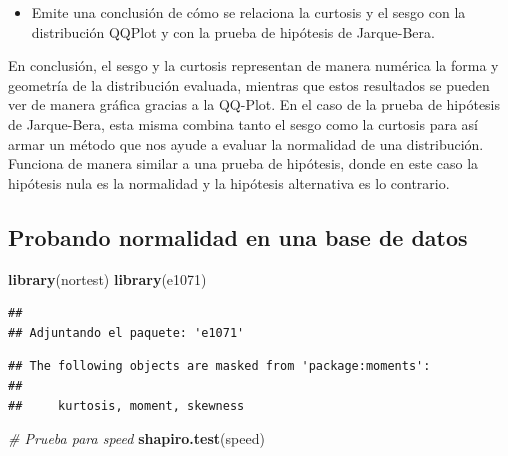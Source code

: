 \documentclass[
]{article}
\newenvironment{Shaded}{\begin{snugshade}}{\end{snugshade}}
\newcommand{\CommentTok}[1]{\textcolor[rgb]{0.56,0.35,0.01}{\textit{#1}}}
\newcommand{\FunctionTok}[1]{\textcolor[rgb]{0.13,0.29,0.53}{\textbf{#1}}}
\newcommand{\NormalTok}[1]{#1}
\newcommand{\OtherTok}[1]{\textcolor[rgb]{0.56,0.35,0.01}{#1}}
\newcommand{\SpecialCharTok}[1]{\textcolor[rgb]{0.81,0.36,0.00}{\textbf{#1}}}
\providecommand{\tightlist}{%
  \setlength{\itemsep}{0pt}\setlength{\parskip}{0pt}}
\begin{document}
\begin{itemize}
\tightlist
\item
  Emite una conclusión de cómo se relaciona la curtosis y el sesgo con
  la distribución QQPlot y con la prueba de hipótesis de Jarque-Bera.
\end{itemize}

En conclusión, el sesgo y la curtosis representan de manera numérica la
forma y geometría de la distribución evaluada, mientras que estos
resultados se pueden ver de manera gráfica gracias a la QQ-Plot. En el
caso de la prueba de hipótesis de Jarque-Bera, esta misma combina tanto
el sesgo como la curtosis para así armar un método que nos ayude a
evaluar la normalidad de una distribución. Funciona de manera similar a
una prueba de hipótesis, donde en este caso la hipótesis nula es la
normalidad y la hipótesis alternativa es lo contrario.

\subsection{Probando normalidad en una base de
datos}\label{probando-normalidad-en-una-base-de-datos}

\begin{Shaded}
\begin{Highlighting}[]
\FunctionTok{library}\NormalTok{(nortest)}
\FunctionTok{library}\NormalTok{(e1071)}
\end{Highlighting}
\end{Shaded}

\begin{verbatim}
## 
## Adjuntando el paquete: 'e1071'
\end{verbatim}

\begin{verbatim}
## The following objects are masked from 'package:moments':
## 
##     kurtosis, moment, skewness
\end{verbatim}

\begin{Shaded}
\end{Shaded}

\begin{Shaded}
\begin{Highlighting}[]
\CommentTok{\# Prueba para \textquotesingle{}speed\textquotesingle{}}
\FunctionTok{shapiro.test}\NormalTok{(speed)}
\end{Highlighting}
\end{Shaded}
\end{document}
